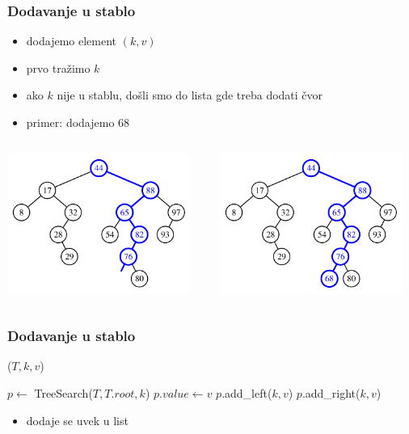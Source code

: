 \documentclass[compress]{beamer}
\begin{document}
\begin{frame}[fragile]
  \frametitle{Dodavanje u stablo}
  \begin{itemize}
    \item dodajemo element $(k, v)$
    \item prvo tražimo $k$
    \item ako $k$ nije u stablu, došli smo do lista gde treba dodati čvor
    \item primer: dodajemo 68
  \end{itemize}
  \begin{columns}
    \begin{column}[c]{6cm}
      \begin{center}
        \includegraphics[width=6cm]{asp-11-pic05a.pdf}
      \end{center}
    \end{column}  
    \begin{column}[c]{6cm}
      \begin{center}
        \includegraphics[width=6cm]{asp-11-pic05b.pdf}
      \end{center}
    \end{column}  
  \end{columns}
\end{frame}

\begin{frame}[fragile]
  \frametitle{Dodavanje u stablo}
($T, k, v$)
\begin{algorithmic}
\STATE $p \leftarrow$ TreeSearch($T, T.root, k$)
  \STATE $p.value \leftarrow v$  
  \STATE $p$.add\_left($k, v$) 
\ELSE
  \STATE $p$.add\_right($k, v$) 
\ENDIF
\end{algorithmic}
  \begin{itemize}
    \item dodaje se uvek u list
  \end{itemize}
\end{frame}
\end{document}
